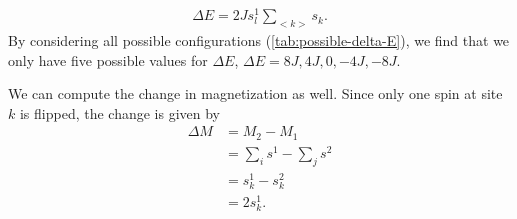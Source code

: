 \documentclass[../main.tex]{subfiles}
\begin{document}
\begin{align}
    \Delta E = 2Js_l^1\sum_{<k>}s_k.
\end{align} By considering all possible configurations (\cref{tab:possible-delta-E}), we find that we only have five possible values for $\Delta E$, \ensuremath{\Delta E= 8J, 4J, 0, -4J, -8J}.

We can compute the change in magnetization as well. Since only one spin at site $k$ is flipped, the change is given by
\begin{align}
    \Delta M &= M_2-M_1 \\
    &= \sum_is^1-\sum_js^2 \\
    &= s_k^1-s_k^2 \\
    &= 2s_k^1.
\end{align}
\end{document}

